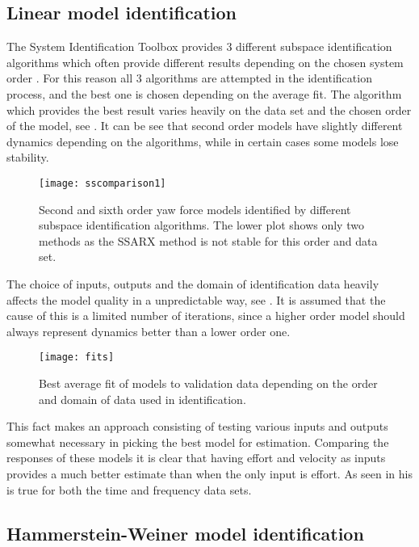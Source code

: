 \subsection{Linear model identification}
The System Identification Toolbox provides 3 different subspace identification algorithms which often provide different results depending on the chosen system order \cite{van1994n4sid}. 
For this reason all 3 algorithms are attempted in the identification process, and the best one is chosen depending on the average fit.
The algorithm which provides the best result varies heavily on the data set and the chosen order of the model, see .
It can be see that second order models have slightly different dynamics depending on the algorithms, while in certain cases some models lose stability.

\begin{figure}[H]
\centering
\hspace{-2em}\texttt{[image: sscomparison1]}
\caption{Second and sixth order yaw force models identified by different subspace identification algorithms. 
The lower plot shows only two methods as the SSARX method is not stable for this order and data set.}
\label{fig:ssid1}
\end{figure}

The choice of inputs, outputs and the domain of identification data heavily affects the model quality in a unpredictable way, see .
It is assumed that the cause of this is a limited number of iterations, since a higher order model should always represent dynamics better than a lower order one.

\begin{figure}[H]
\hspace{-2.5em}\texttt{[image: fits]}
\caption{Best average fit of models to validation data depending on the order and domain of data used in identification.}
\label{fig:fits}
\end{figure}

This fact makes an approach consisting of testing various inputs and outputs somewhat necessary in picking the best model for estimation.
Comparing the responses of these models it is clear that having effort and velocity as inputs provides a much better estimate than when the only input is effort.
As seen in  his is true for both the time and frequency data sets.

\newpage
\subsection{Hammerstein-Weiner model identification}\label{hammerWeinmodeid}

